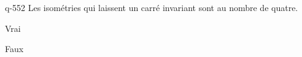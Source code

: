 \begin{truefalse}{q-552}
Les isométries qui laissent un carré invariant sont au nombre de quatre.
\item Vrai
\item* Faux
\end{truefalse}

